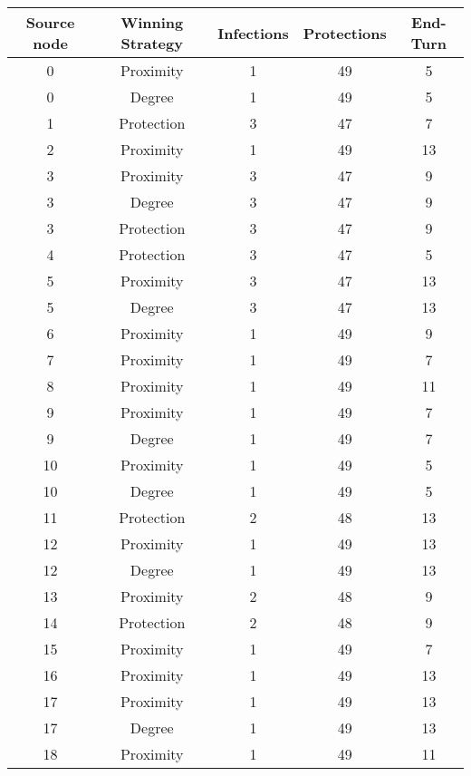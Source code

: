 \documentclass[results.tex]{subfiles}
\begin{document}
\begin{center}
  \begin{tabular}{| c || c | c | c | c |}
    \hline
    {\bfseries Source node} & {\bfseries Winning Strategy} & {\bfseries Infections} & {\bfseries Protections} & {\bfseries End-Turn} \\  %
    \hline\hline
    0 & Proximity & 1 & 49 & 5 \\ 
    \hline
    0 & Degree & 1 & 49 & 5 \\ 
    \hline
    1 & Protection & 3 & 47 & 7 \\ 
    \hline
    2 & Proximity & 1 & 49 & 13 \\ 
    \hline
    3 & Proximity & 3 & 47 & 9 \\ 
    \hline
    3 & Degree & 3 & 47 & 9 \\ 
    \hline
    3 & Protection & 3 & 47 & 9 \\ 
    \hline
    4 & Protection & 3 & 47 & 5 \\ 
    \hline
    5 & Proximity & 3 & 47 & 13 \\ 
    \hline
    5 & Degree & 3 & 47 & 13 \\ 
    \hline
    6 & Proximity & 1 & 49 & 9 \\ 
    \hline
    7 & Proximity & 1 & 49 & 7 \\ 
    \hline
    8 & Proximity & 1 & 49 & 11 \\ 
    \hline
    9 & Proximity & 1 & 49 & 7 \\ 
    \hline
    9 & Degree & 1 & 49 & 7 \\ 
    \hline
    10 & Proximity & 1 & 49 & 5 \\ 
    \hline
    10 & Degree & 1 & 49 & 5 \\ 
    \hline
    11 & Protection & 2 & 48 & 13 \\ 
    \hline
    12 & Proximity & 1 & 49 & 13 \\ 
    \hline
    12 & Degree & 1 & 49 & 13 \\ 
    \hline
    13 & Proximity & 2 & 48 & 9 \\ 
    \hline
    14 & Protection & 2 & 48 & 9 \\ 
    \hline
    15 & Proximity & 1 & 49 & 7 \\ 
    \hline
    16 & Proximity & 1 & 49 & 13 \\ 
    \hline
    17 & Proximity & 1 & 49 & 13 \\ 
    \hline
    17 & Degree & 1 & 49 & 13 \\ 
    \hline
    18 & Proximity & 1 & 49 & 11 \\ 

\end{tabular}
\end{center}
\end{document}
